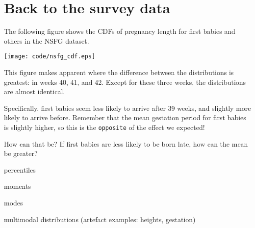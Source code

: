 \documentclass[10pt]{book}
\begin{document}
\section{Back to the survey data}

The following figure shows the CDFs of pregnancy length
for first babies and others in the NSFG dataset.

\beforefig
\centerline{\texttt{[image: code/nsfg\_cdf.eps]}}
\afterfig

This figure makes apparent where the difference between the
distributions is greatest: in weeks 40, 41, and 42.  Except for these
three weeks, the distributions are almost identical.

Specifically, first babies seem less likely to arrive after 39
weeks, and slightly more likely to arrive before.  Remember that
the mean gestation period for first babies is slightly higher,
so this is the {\tt opposite} of the effect we expected!

How can that be?  If first babies are less likely to be born late,
how can the mean be greater?


percentiles

moments

modes

   multimodal distributions (artefact examples: heights, gestation)

\printindex

\clearemptydoublepage
\end{document}
